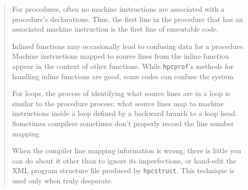 \documentclass{article}
\newcommand{\HPCToolkit}{\textsc{HPCToolkit}}
\newcommand{\hpcstruct}{\texttt{hpcstruct}}
\newcommand{\hpcprof}{\texttt{hpcprof}}
\begin{document}
\begin{quote}
For procedures, often no machine instructions are associated with a
procedure's declarations. Thus, the first line in the procedure that
has an associated machine instruction is the first line of executable
code.

Inlined functions may occasionally lead to confusing data for a
procedure. Machine instructions mapped to source lines from the inline
function appear in the context of other functions. While \hpcprof 's
methods for handling inline functions are good, some codes can confuse
the system.

For loops, the process of identifying what source lines are in a loop
is similar to the procedure process: what source lines map to machine
instructions inside a loop defined by a backward branch to a loop
head. Sometimes compilers sometimes don’t properly record the line
number mapping.

\begin{comment}
  
Some common constructs such as Fortran's statement functions lead to
confusing output from \hpcstruct , \HPCToolkit 's binary analyzer. With
Compaq's C compiler on Alpha systems, machine instructions that result
from forward substitution of statement functions are mapped back to
the line numbers in which the statement functions are defined. \verb|bloop|'s
normalization phase ensures that source lines will appear only once in
hpcviewer’s display. Thus different loops in which the same statement
functions are instantiated will appear fused in the program structure
after \verb|bloop|'s normalization. There is no simple fix for this
problem. A related issue is that sampled performance data for a
machine instruction is mapped back to the source line that a machine
instruction was derived from.  When machine instructions found in
different loops map back to the source line for a statement function,
performance is not going to be attributed correctly. To cope with this
issue, the whole \HPCToolkit\ tool chain needs modifications to cope
with the fact that there are multiple instances of a source line that
need to be processed and viewed as distinct entities.

With SGI's \verb|MIPspro| compilers, we have seen loop headers attributed to
the last line before the loop containing executable code. In the case
of the Intel compiler, sometimes machine instructions found in
optimized code map to the end of the source file. Yuck!
\end{comment}

When the compiler line mapping information is wrong, there is little
you can do about it other than to ignore its imperfections, or
hand-edit the XML program structure file produced by \hpcstruct . This
technique is used only when truly desparate.
\end{quote}
\end{document}
